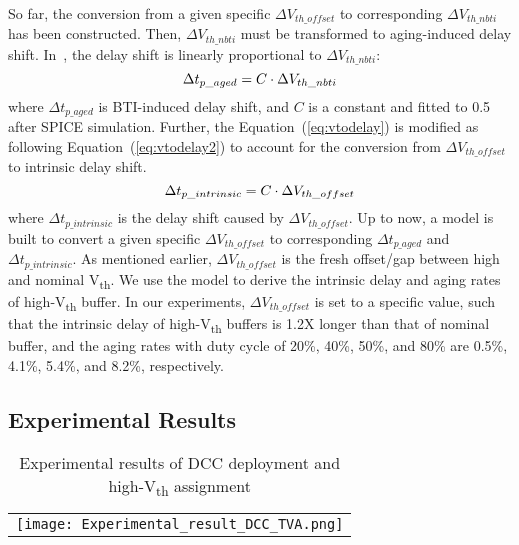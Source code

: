 So far, the conversion from a given specific $\Delta V_{th\_offset}$ to corresponding $\Delta V_{th\_nbti}$ has been constructed. Then, $\Delta V_{th\_nbti}$ must be transformed to aging-induced delay shift. In~\cite{wang2007efficient}, the delay shift is linearly proportional to $\Delta V_{th\_nbti}$:
\begin{equation}
	\centering
	\Delta t_{p\_aged} = C \cdot \Delta V_{th\_nbti}
	\label{eq:vtodelay}
\end{equation}	
where $\Delta t_{p\_aged}$ is BTI-induced delay shift, and $C$ is a constant and fitted to 0.5 after SPICE simulation. Further, the Equation~(\ref{eq:vtodelay}) is modified as following Equation~(\ref{eq:vtodelay2}) to account for the conversion from $\Delta V_{th\_offset}$ to intrinsic delay shift. 
\begin{equation}
	\centering
	\Delta t_{p\_intrinsic} = C \cdot \Delta V_{th\_offset}
	\label{eq:vtodelay2}
\end{equation}	
where $\Delta t_{p\_intrinsic}$ is the delay shift caused by $\Delta V_{th\_offset}$. Up to now, a model is built to convert a given specific $\Delta V_{th\_offset}$ to corresponding $\Delta t_{p\_aged}$ and $\Delta t_{p\_intrinsic}$. As mentioned earlier, $\Delta V_{th\_offset}$ is the fresh offset/gap between high and nominal V\textsubscript{th}. We use the model to derive the intrinsic delay and aging rates of high-V\textsubscript{th} buffer. In our experiments, $\Delta V_{th\_offset}$ is set to a specific value, such that the intrinsic delay of high-V\textsubscript{th} buffers is 1.2X longer than that of nominal buffer, and the aging rates with duty cycle of 20\%, 40\%, 50\%, and 80\% are 0.5\%, 4.1\%, 5.4\%, and 8.2\%, respectively.

\subsection{Experimental Results}
\begin{table*}
\centering
\caption{Experimental results of DCC deployment and high-V\textsubscript{th} assignment}
	\begin{tabular}{l}
	\texttt{[image: Experimental\_result\_DCC\_TVA.png]}
	\end{tabular}
\label{table:exp2}
\end{table*}

